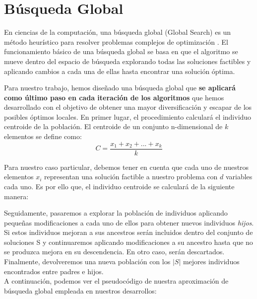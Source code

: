 \section{Búsqueda Global}\label{sec:BG}

En ciencias de la computación, una búsqueda global (Global Search) es un método heurístico para resolver problemas complejos de optimización \cite{GlobalSearch, GlobalSearch2, GlobalSearch3}. %
%
El funcionamiento básico de una búsqueda global se basa en que el algoritmo se mueve dentro del espacio de búsqueda explorando todas las soluciones factibles y aplicando cambios a cada una de ellas hasta encontrar una solución óptima. 

Para nuestro trabajo, hemos diseñado una búsqueda global que \textbf{se aplicará como último paso en cada iteración de los algoritmos} que hemos desarrollado con el objetivo de obtener una mayor diversificación y escapar de los posibles óptimos locales. En primer lugar, el procedimiento calculará el individuo centroide de la población. El centroide de un conjunto n-dimensional de $k$ elementos se define como:
\begin{equation}\label{centroide}
    C = \frac{x_{1} + x_{2} + ... + x_{k}}{k}
\end{equation}

Para nuestro caso particular, debemos tener en cuenta que cada uno de nuestros elementos $x_{i}$ representan una solución factible a nuestro problema con $d$ variables cada uno. Es por ello que, el individuo centroide se calculará de la siguiente manera: 

Seguidamente, pasaremos a explorar la población de individuos aplicando pequeñas modificaciones a cada uno de ellos para obtener nuevos individuos \textit{hijos}. Si estos individuos mejoran a sus ancestros serán incluidos dentro del conjunto de soluciones S y continuaremos aplicando modificaciones a su ancestro hasta que no se produzca mejora en su descendencia. En otro caso, serán descartados.
Finalmente, devolveremos una nueva población con los $|S|$ mejores individuos encontrados entre padres e hijos. \\
A continuación, podemos ver el pseudocódigo de nuestra aproximación de búsqueda global empleada en nuestros desarrollos: 


